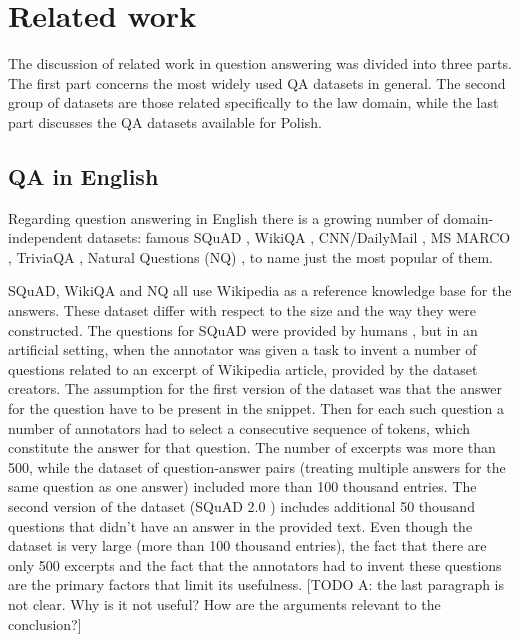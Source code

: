 


\section{Related work}

The discussion of related work in question answering was divided into three parts. The first part concerns the most widely
used QA datasets in general. The second group of datasets are those related specifically to the law domain, while
the last part discusses the QA datasets available for Polish.



\subsection{QA in English}

Regarding question answering in English there is a growing number of domain-independent datasets: famous SQuAD
\cite{rajpurkar2016squad}, WikiQA \cite{yang2015wikiqa}, CNN/DailyMail \cite{hermann2015teaching}, MS MARCO
\cite{bajaj2016ms}, TriviaQA \cite{joshi2017triviaqa}, Natural Questions (NQ) \cite{kwiatkowski2019natural}, to name just
the most popular of them.

SQuAD, WikiQA and NQ all use Wikipedia as a reference knowledge base for the answers. These dataset
differ with respect to the size and the way they were constructed. The questions for SQuAD were provided by humans \cite{rajpurkar2016squad}, but in an artificial setting, when the annotator was given a task to invent a number of questions related to an excerpt of Wikipedia article, provided by the dataset creators. The assumption for the first version of the dataset was that the answer for
the question have to be present in the snippet. Then for each such question a number of annotators had to select a consecutive sequence of tokens, which constitute the answer for that question. The number of excerpts was more than 500, while the dataset of question-answer pairs (treating multiple answers for the same question as one answer) included more than 100 thousand
entries. The second version of the dataset (SQuAD 2.0 \cite{rajpurkar2018know}) includes additional 50 thousand questions that didn't have an answer in the provided text. Even though the dataset is very large (more than 100 thousand entries), the fact that there are only 500 excerpts and the fact that the annotators had to invent these questions are the primary factors that limit its usefulness. [TODO A: the last paragraph is not clear. Why is it not useful? How are the arguments relevant to the conclusion?]

